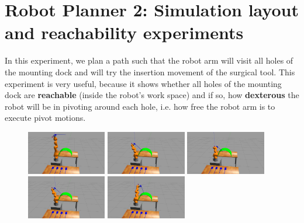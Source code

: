 \section{Robot Planner 2: Simulation layout and reachability experiments}

In this experiment, we plan a path such that the robot arm will visit all holes of the mounting dock and will try the insertion movement of the surgical tool.
This experiment is very useful, because it shows whether all holes of the mounting dock are \textbf{reachable} (inside the robot's work space) and if so, how 
\textbf{dexterous} the robot will be in pivoting around each hole, i.e. how free the robot arm is to execute pivot motions.

\begin{center}
\begin{figure}[H]
\centering
\includegraphics[width=0.31\textwidth]{images/robot_planner2/robot_planner2_1}
\includegraphics[width=0.31\textwidth]{images/robot_planner2/robot_planner2_2}
\includegraphics[width=0.31\textwidth]{images/robot_planner2/robot_planner2_3}\\
\includegraphics[width=0.31\textwidth]{images/robot_planner2/robot_planner2_4}
\includegraphics[width=0.31\textwidth]{images/robot_planner2/robot_planner2_5}

\end{figure}
\end{center}
